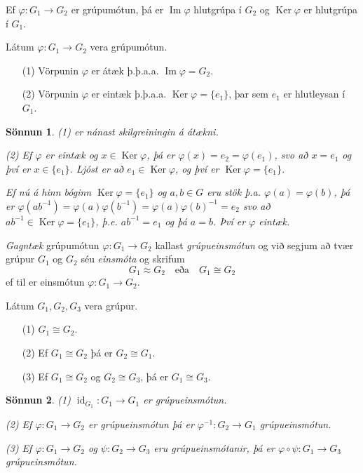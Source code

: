 \documentclass[a4paper,icelandic,11pt]{book}
\theoremstyle{plain}
\newtheorem*{sonnun}{Sönnun}
\DeclareMathOperator{\id}{id} %
\DeclareMathOperator{\im}{Im} %
\DeclareMathOperator{\Ker}{Ker} %
\begin{document}
\begin{fylgisetn}
  Ef $\varphi:G_1\to G_2$ er grúpumótun, þá er $\im \varphi$ hlutgrúpa í $G_2$
  og $\Ker\varphi$ er hlutgrúpa í $G_1$.
\end{fylgisetn}
\begin{setn}
  Látum $\varphi:G_1\to G_2$ vera grúpumótun.
  \begin{itemize}
    \item [(1)] Vörpunin $\varphi$ er átæk þ.þ.a.a. $\im \varphi = G_2$.
    \item [(2)] Vörpunin $\varphi$ er eintæk þ.þ.a.a. $\Ker \varphi = \{e_1\}$,
      þar sem $e_1$ er hlutleysan í $G_1$.
  \end{itemize}
\end{setn}
\begin{sonnun}
  (1) er nánast skilgreiningin á átækni.
  
  (2) Ef $\varphi$ er eintæk og $x\in \Ker\varphi$, þá er $\varphi(x)=e_2 =
  \varphi(e_1)$, svo að $x=e_1$ og því er $x\in \{e_1\}$. Ljóst er að $e_1\in
  \Ker \varphi$, og því er $\Ker\varphi = \{e_1\}$.
  
  Ef nú á hinn bóginn $\Ker\varphi = \{e_1\}$ og $a,b\in G$ eru stök þ.a.
  $\varphi(a) = \varphi(b)$, þá er $\varphi(ab^{-1}) = \varphi(a)\varphi(b^{-1})
  = \varphi(a)\varphi(b)^{-1} = e_2$ svo að $ab^{-1} \in \Ker\varphi = \{e_1\}$,
  þ.e. $ab^{-1} = e_1$ og þá $a=b$. Því er $\varphi$ eintæk.
\end{sonnun}
\begin{skilgr}
  \emph{Gagntæk} grúpumótun $\varphi:G_1\to G_2$ kallast
  \emph{grúpueinsmótun}
  og við segjum að tvær grúpur $G_1$ og $G_2$ séu
  \emph{einsmóta} og skrifum 
  \[
    G_1 \approx G_2 \quad \text{eða}\quad G_1 \cong G_2
  \]
  ef til er einsmótun $\varphi:G_1\to G_2$.
\end{skilgr}
\begin{setn}
  Látum $G_1, G_2, G_3$ vera grúpur.
  \begin{itemize}
    \item [(1)] $G_1\cong G_2$.
    \item [(2)] Ef $G_1\cong G_2$ þá er $G_2\cong G_1$.
    \item [(3)] Ef $G_1\cong G_2$ og $G_2\cong G_3$, þá er $G_1\cong G_3$.
  \end{itemize}
\end{setn}
\begin{sonnun}
  (1) $\id_{G_1}:G_1\to G_1$ er grúpueinsmótun.
  
  (2) Ef $\varphi:G_1\to G_2$ er grúpueinsmótun þá er $\varphi^{-1}:G_2\to G_1$ grúpueinsmótun.
  
  (3) Ef $\varphi:G_1\to G_2$ og $\psi: G_2\to G_3$ eru grúpueinsmótanir, þá er $\varphi\circ\psi:G_1\to G_3$ grúpueinsmótun.
\end{sonnun}
\end{document}
